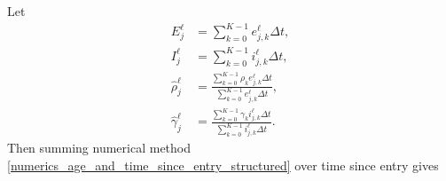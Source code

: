 \documentclass[USenglish]{article}
\begin{document}
Let
\begin{subequations}
  \begin{align}
    E_j^{\ell}
    &= \sum_{k = 0}^{K - 1} e_{j, k}^{\ell} \Delta t,
    \\
    I_j^{\ell}
    &= \sum_{k = 0}^{K - 1} i_{j, k}^{\ell} \Delta t,
    \\
    \hat{\rho}_j^{\ell}
    &= \frac{\sum_{k = 0}^{K - 1} \rho_k e_{j, k}^{\ell} \Delta t}
      {\sum_{k = 0}^{K - 1} e_{j, k}^{\ell} \Delta t},
    \\
    \hat{\gamma}_j^{\ell}
    &= \frac{\sum_{k = 0}^{K - 1} \gamma_k i_{j, k}^{\ell} \Delta t}
      {\sum_{k = 0}^{K - 1} i_{j, k}^{\ell} \Delta t}.
  \end{align}
\end{subequations}
Then summing numerical method
\eqref{numerics_age_and_time_since_entry_structured} over time since
entry gives
\end{document}
